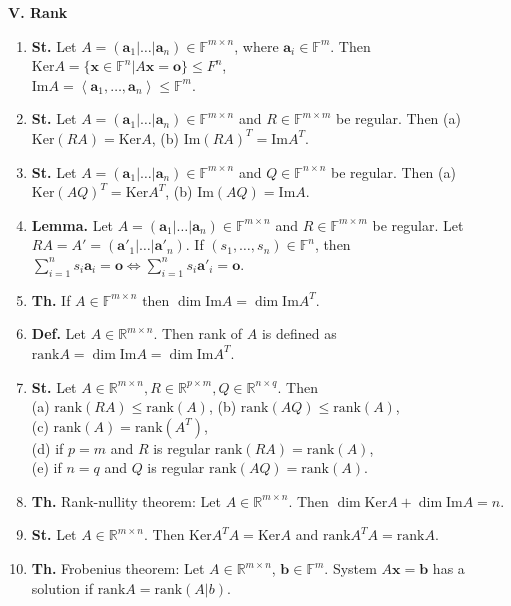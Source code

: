 \documentclass{article}
\newcommand{\<}{\left<}
\renewcommand{\>}{\right>}
\newcommand{\im}{\text{Im}}
\renewcommand{\ker}{\text{Ker}}
\newcommand{\rank}{\text{rank}}
\newcommand{\R}{\mathbb{R}}
\newcommand{\F}{\mathbb{F}}
\newcommand{\define}{\textbf{Def. }}
\newcommand{\lemma}{\textbf{Lemma. }}
\newcommand{\state}{\textbf{St. }}
\newcommand{\theor}{\textbf{Th. }}
\begin{document}
\begin{multicols}{3}
\begin{enumerate}[itemsep=2pt, topsep=2pt, partopsep=2pt, parsep=2pt]
    \end{enumerate}

    \textbf{V. Rank}

    \begin{enumerate}[itemsep=2pt, topsep=2pt, partopsep=2pt, parsep=2pt]

        \item \state Let $A=(\bm a_1|\ldots|\bm a_n)\in\F^{m\times n}$, where $\bm a_i\in\F^m$. Then\\$\ker A=\{\bm x\in\F^n|A\bm x=\bm o\}\leq F^n$,\\$\im A=\<\bm a_1,\ldots,\bm a_n\>\leq\F^m$.
        \item \state Let $A=(\bm a_1|\ldots|\bm a_n)\in\F^{m\times n}$ and $R\in\F^{m\times m}$ be regular. Then (a) $\ker\left(RA\right)=\ker A$, (b) $\im\left(RA\right)^T=\im A^T$.
        \item \state Let $A=(\bm a_1|\ldots|\bm a_n)\in\F^{m\times n}$ and $Q\in\F^{n\times n}$ be regular. Then (a) $\ker\left(AQ\right)^T=\ker A^T$, (b) $\im\left(AQ\right)=\im A$.
        \item \lemma Let $A=(\bm a_1|\ldots|\bm a_n)\in\F^{m\times n}$ and $R\in\F^{m\times m}$ be regular. Let $RA=A'=(\bm a'_1|\ldots|\bm a'_n)$. If $(s_1,\ldots,s_n)\in\F^n$, then\\$\sum^n_{i=1}s_i\bm a_i=\bm o\Longleftrightarrow\sum^n_{i=1}s_i\bm a'_i=\bm o$.
        \item \theor If $A\in\F^{m\times n}$ then $\dim\im A=\dim\im A^T$.
        \item \define Let $A\in\R^{m\times n}$. Then rank of $A$ is defined as $\rank A=\dim\im A=\dim\im A^T$.
        \item \state Let $A\in\R^{m\times n},R\in\R^{p\times m},Q\in\R^{n\times q}$. Then\\(a) $\rank(RA)\leq\rank(A)$, (b) $\rank(AQ)\leq\rank(A)$,\\(c) $\rank(A)=\rank(A^T)$,\\(d) if $p=m$ and $R$ is regular $\rank(RA)=\rank(A)$,\\(e) if $n=q$ and $Q$ is regular $\rank(AQ)=\rank(A)$.
        \item \theor Rank-nullity theorem: Let $A\in\R^{m\times n}$. Then $\dim\ker A+\dim\im A=n$.
        \item \state Let $A\in\R^{m\times n}$. Then $\ker A^TA=\ker A$ and $\rank A^TA=\rank A$.
        \item \theor Frobenius theorem: Let $A\in\R^{m\times n}$, $\bm b\in\F^m$. System $A\bm x=\bm b$ has a solution if $\rank A=\rank(A|b)$.


\end{enumerate}
\end{multicols}
\end{document}
